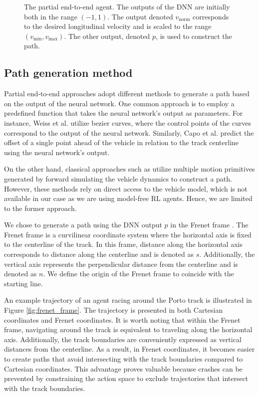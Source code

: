 \begin{figure}[htb!]
    \centering
    
    \caption[The partial end-to-end planner agent]{The partial end-to-end agent. The outputs of the DNN are initially both in the range $(-1,1)$. The output denoted $v_{\text{norm}}$ corresponds to the desired longitudinal velocity and is scaled to the range $(v_{\text{min}}, v_{\text{max}})$. The other output, denoted $p$, is used to construct the path.}
    \label{fig:steer_vel_agent}
\end{figure}


\subsection{Path generation method}\label{sec:path_construction}

Partial end-to-end approaches adopt different methods to generate a path based on the output of the neural network. 
One common approach is to employ a predefined function that takes the neural network's output as parameters. 
For instance, Weiss et al. \cite{Weiss2020a} utilize bezier curves, where the control points of the curves correspond to the output of the neural network. 
Similarly, Capo et al. \cite{Capo2020} predict the offset of a single point ahead of the vehicle in relation to the track centerline using the neural network's output.

On the other hand, classical approaches such as \cite{keefer2022, Liniger2015a, Wang2021} utilize multiple motion primitives generated by forward simulating the vehicle dynamics to construct a path. 
However, these methods rely on direct access to the vehicle model, which is not available in our case as we are using model-free RL agents.
Hence, we are limited to the former approach.


We chose to generate a path using the DNN output $p$ in the Frenet frame \cite{Stahl2019}.
The Frenet frame is a curvilinear coordinate system where the horizontal axis is fixed to the centerline of the track. 
In this frame, distance along the horizontal axis corresponds to distance along the centerline and is denoted as $s$. 
Additionally, the vertical axis represents the perpendicular distance from the centerline and is denoted as $n$.
We define the origin of the Frenet frame to coincide with the starting line.


An example trajectory of an agent racing around the Porto track is illustrated in Figure \ref{fig:frenet_frame}. 
The trajectory is presented in both Cartesian coordinates and Frenet coordinates. 
It is worth noting that within the Frenet frame, navigating around the track is equivalent to traveling along the horizontal axis. 
Additionally, the track boundaries are conveniently expressed as vertical distances from the centerline. 
As a result, in Frenet coordinates, it becomes easier to create paths that avoid intersecting with the track boundaries compared to Cartesian coordinates. 
This advantage proves valuable because crashes can be prevented by constraining the action space to exclude trajectories that intersect with the track boundaries.


